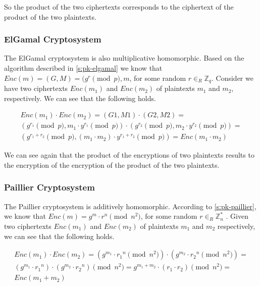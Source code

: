 So the product of the two ciphertexts corresponds to the ciphertext of the product of the two plaintexts.

\subsubsection{ElGamal Cryptosystem}\label{ss:elgamal}
The ElGamal cryptosystem is also multiplicative homomorphic. Based on the algorithm described in \ref{s:pk-elgamal} we know that $Enc(m) = (G,M) = (g^{r} \pmod{p}, m$, for some random $r \in_{R} \mathbb{Z}_{q}$. Consider we have two ciphertexts $Enc(m_1)$ and $Enc(m_2)$ of plaintexts $m_1$ and $m_2$, respectively. We can see that the following holds.

\begin{equation}
  \label{eq:homomorphic-elgamal}
  \begin{gathered}
Enc(m_1) \cdot Enc(m_2) = (G1, M1) \cdot (G2, M2) =\\ (g^{r_1} \pmod{p}, m_1 \cdot y^{r_1} \pmod{p}) \cdot (g^{r_2} \pmod{p}, m_2 \cdot y^{r_2} \pmod{p}) =\\ (g^{r_1+r_2} \pmod{p}, (m_1 \cdot m_2) \cdot y^{r_1+r_2} \pmod{p}) = Enc({m_1} \cdot {m_2})
  \end{gathered}
\end{equation}

We can see again that the product of the encryptions of two plaintexts results to the encryption of the encryption of the product of the two plaintexts.

\subsubsection{Paillier Cryptosystem}\label{ss:paillier}
The Paillier cryptosystem is additively homomorphic. According to \ref{s:pk-paillier}, we know that $Enc(m) = g^{m} \cdot r^n \pmod{n^2}$, for some random $ r \in_{R} \mathbb{Z}_{n}^{*}$ . Given two ciphertexts $Enc(m_1)$ and $Enc(m_2)$ of plaintexts $m_1$ and $m_2$ respectively, we can see that the following holds.

\begin{equation}
  \label{eq:homomorphic-paillier}
  \begin{gathered}
Enc(m_1) \cdot Enc(m_2) = (g^{m_1} \cdot {r_1}^n \pmod{n^2}) \cdot (g^{m_2} \cdot {r_2}^n \pmod{n^2}) =\\ (g^{m_1} \cdot {r_1}^n) \cdot (g^{m_2} \cdot {r_2}^n)\pmod{n^2} = g^{m_1 + m_2} \cdot (r_1 \cdot r_2) \pmod{n^2} =\\ Enc({m_1} + {m_2})
  \end{gathered}
\end{equation}

